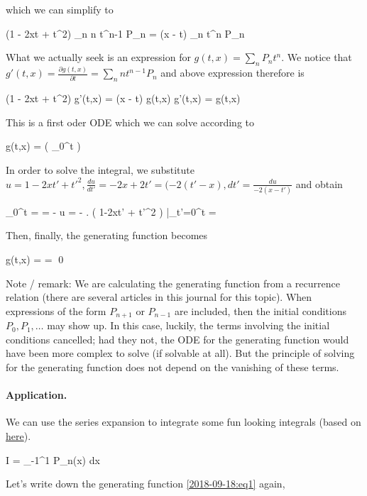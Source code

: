 which we can simplify to

\bee
(1 - 2xt + t^2) \sum_n n t^{n-1} P_n = (x - t) \sum_n t^n P_n
\eee

What we actually seek is an expression for $g(t,x) = \sum_n P_n t^n$. We notice that $g'(t,x) = \frac{\partial g(t,x)}{\partial t} = \sum_n n t^{n-1} P_n$ and above expression therefore is

\bee
(1 - 2xt + t^2) g'(t,x) = (x - t) g(t,x) \rightarrow g'(t,x) =  g(t,x)
\eee

This is a first oder ODE which we can solve according to

\bee
g(t,x) = \exp \left( \int_0^t  \right)
\eee

In order to solve the integral, we substitute $u = 1-2xt'+t'^2, \frac{du}{dt'} = -2x+2t' = (-2(t'-x), dt' = \frac{du}{-2(x-t')}$ and obtain

\bee
\int_0^t  = \int {} = - \ln u = -  \ln \left. \left( 1-2xt' + t'^2 \right) \right|_{t'=0}^t = \ln {}
\eee

Then, finally, the generating function becomes

\bee
g(t,x) = \exp \ln {} =  \qed
\eee

Note / remark: We are calculating the generating function from a recurrence relation (there are several articles in this journal for this topic). When expressions of the form $P_{n+1}$ or $P_{n-1}$ are included, then the initial conditions $P_0, P_1, \ldots$ may show up. In this case, luckily, the terms involving the initial conditions cancelled; had they not, the ODE for the generating function would have been more complex to solve (if solvable at all). But the principle of solving for the generating function does not depend on the vanishing of these terms.


\paragraph{Application.} We can use the series expansion to integrate some fun looking integrals (based on \href{https://math.stackexchange.com/questions/1611224/calculating-i-int-11-dfrac1-sqrt1-xp-nx-dx-where-p-n-is-a?rq=1}{here}).

\bee
I = \int_{-1}^1  P_n(x) dx
\eee

Let's write down the generating function \eqref{2018-09-18:eq1} again,

